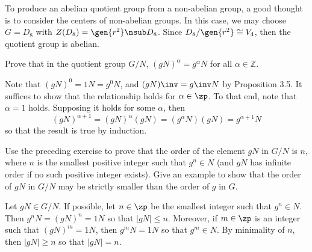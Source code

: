 \begin{problems}
\begin{sol}
        To produce an abelian quotient group from a non-abelian group, a good thought is to consider the centers of non-abelian groups. In this case, we may choose $G = D_8$ with $Z(D_8) = \gen{r^2} \nsub D_8$. Since $D_8/\gen{r^2} \cong V_4$, then the quotient group is abelian.
    \end{sol}
    \item Prove that in the quotient group $G/N$, $(gN)^{\alpha} = g^{\alpha}N$ for all $\alpha \in \mathbb{Z}$.
    \begin{sol}
        Note that $(gN)^0 = 1N = g^0N$, and $(gN)\inv = g\inv N$ by Proposition 3.5. It suffices to show that the relationship holds for $\alpha \in \zp$. To that end, note that $\alpha = 1$ holds. Supposing it holds for some $\alpha$, then
        \[(gN)^{\alpha + 1} = (gN)^\alpha (gN) = (g^\alpha N)(gN) = g^{\alpha + 1}N\]
        so that the result is true by induction.
    \end{sol}
    \item Use the preceding exercise to prove that the order of the element $gN$ in $G/N$ is $n$, where $n$ is the smallest positive integer such that $g^n \in N$ (and $gN$ has infinite order if no such positive integer exists). Give an example to show that the order of $gN$ in $G/N$ may be strictly smaller than the order of $g$ in $G$.
    \begin{sol}
        Let $gN \in G/N$. If possible, let $n \in \zp$ be the smallest integer such that $g^n \in N$. Then $g^nN = (gN)^n = 1N$ so that $|gN| \leq n$. Moreover, if $m \in \zp$ is an integer such that $(gN)^m = 1N$, then $g^mN = 1N$ so that $g^m \in N$. By minimality of $n$, then $|gN| \geq n$ so that $|gN| = n$.


\end{sol}
\end{problems}
